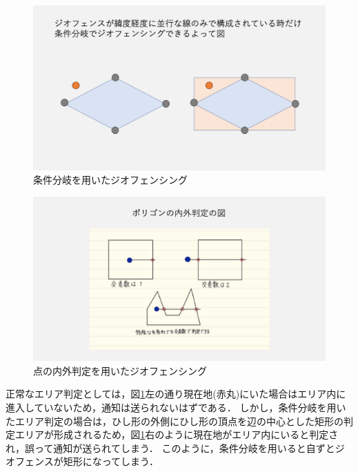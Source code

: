 \begin{figure}[tbh]
    \centering
    \includegraphics[width=16cm]{img_polygon_1.png}
    \caption{条件分岐を用いたジオフェンシング}
    \label{fig:polygon_1}
\end{figure}

\begin{figure}[tbh]
    \centering
    \includegraphics[width=16cm]{img_polygon_2.png}
    \caption{点の内外判定を用いたジオフェンシング}
    \label{fig:polygon_2}
\end{figure}

正常なエリア判定としては，図\ref{fig:polygon_1}左の通り現在地(赤丸)にいた場合はエリア内に進入していないため，通知は送られないはずである．
しかし，条件分岐を用いたエリア判定の場合は，ひし形の外側にひし形の頂点を辺の中心とした矩形の判定エリアが形成されるため，図\ref{fig:polygon_1}右のように現在地がエリア内にいると判定され，誤って通知が送られてしまう．
このように，条件分岐を用いると自ずとジオフェンスが矩形になってしまう．

